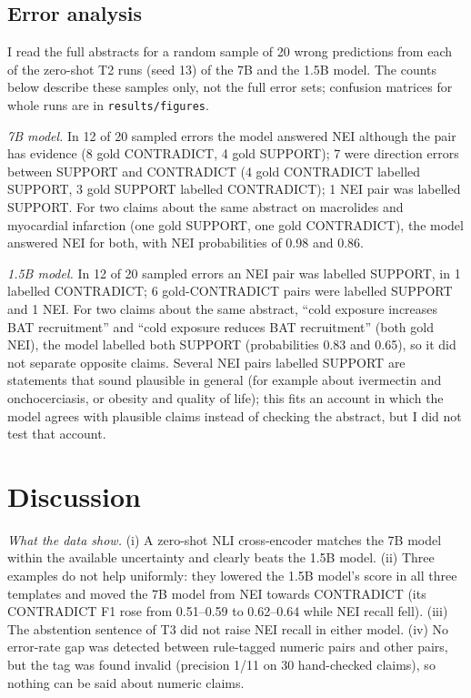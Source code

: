 \documentclass[conference]{IEEEtran}
\begin{document}
\subsection{Error analysis}
I read the full abstracts for a random sample of 20 wrong predictions from each of the zero-shot T2 runs (seed 13) of the 7B and the 1.5B model. The counts below describe these samples only, not the full error sets; confusion matrices for whole runs are in \texttt{results/figures}.

\emph{7B model.} In 12 of 20 sampled errors the model answered NEI although the pair has evidence (8 gold CONTRADICT, 4 gold SUPPORT); 7 were direction errors between SUPPORT and CONTRADICT (4 gold CONTRADICT labelled SUPPORT, 3 gold SUPPORT labelled CONTRADICT); 1 NEI pair was labelled SUPPORT. For two claims about the same abstract on macrolides and myocardial infarction (one gold SUPPORT, one gold CONTRADICT), the model answered NEI for both, with NEI probabilities of 0.98 and 0.86.

\emph{1.5B model.} In 12 of 20 sampled errors an NEI pair was labelled SUPPORT, in 1 labelled CONTRADICT; 6 gold-CONTRADICT pairs were labelled SUPPORT and 1 NEI. For two claims about the same abstract, ``cold exposure increases BAT recruitment'' and ``cold exposure reduces BAT recruitment'' (both gold NEI), the model labelled both SUPPORT (probabilities 0.83 and 0.65), so it did not separate opposite claims. Several NEI pairs labelled SUPPORT are statements that sound plausible in general (for example about ivermectin and onchocerciasis, or obesity and quality of life); this fits an account in which the model agrees with plausible claims instead of checking the abstract, but I did not test that account.

\section{Discussion}
\emph{What the data show.} (i) A zero-shot NLI cross-encoder matches the 7B model within the available uncertainty and clearly beats the 1.5B model. (ii) Three examples do not help uniformly: they lowered the 1.5B model's score in all three templates and moved the 7B model from NEI towards CONTRADICT (its CONTRADICT F1 rose from 0.51--0.59 to 0.62--0.64 while NEI recall fell). (iii) The abstention sentence of T3 did not raise NEI recall in either model. (iv) No error-rate gap was detected between rule-tagged numeric pairs and other pairs, but the tag was found invalid (precision 1/11 on 30 hand-checked claims), so nothing can be said about numeric claims.
\end{document}
